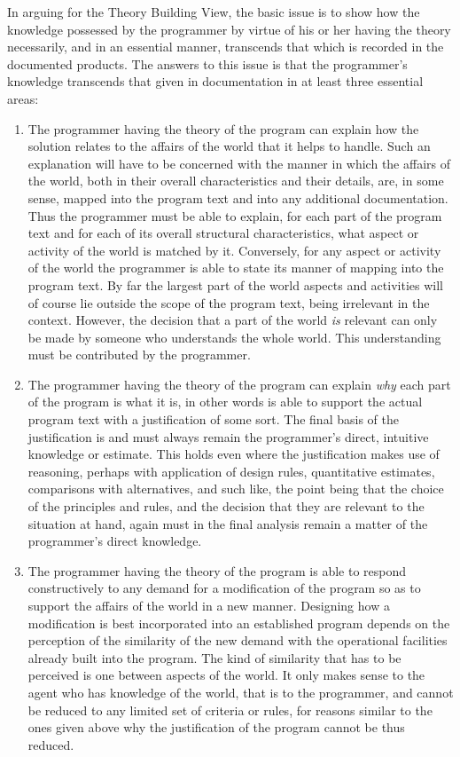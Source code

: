\documentclass[12pt,letterpaper,twocolumn]{article}
\begin{document}
In arguing for the Theory Building View, the basic issue is to show how the knowledge possessed by the programmer by virtue of his or her having the theory necessarily, and in an essential manner, transcends that which is recorded in the documented products. The answers to this issue is that the programmer's knowledge transcends that given in documentation in at least three essential areas:
\begin{enumerate}
\item The programmer having the theory of the program can explain how the solution relates to the affairs of the world that it helps to handle. Such an explanation will have to be concerned with the manner in which the affairs of the world, both in their overall characteristics and their details, are, in some sense, mapped into the program text and into any additional documentation. Thus the programmer must be able to explain, for each part of the program text and for each of its overall structural characteristics, what aspect or activity of the world is matched by it. Conversely, for any aspect or activity of the world the programmer is able to state its manner of mapping into the program text. By far the largest part of the world aspects and activities will of course lie outside the scope of the program text, being irrelevant in the context. However, the decision that a part of the world \emph{is} relevant can only be made by someone who understands the whole world. This understanding must be contributed by the programmer.

\item The programmer having the theory of the program can explain \emph{why} each part of the program is what it is, in other words is able to support the actual program text with a justification of some sort. The final basis of the justification is and must always remain the programmer's direct, intuitive knowledge or estimate. This holds even where the justification makes use of reasoning, perhaps with application of design rules, quantitative estimates, comparisons with alternatives, and such like, the point being that the choice of the principles and rules, and the decision that they are relevant to the situation at hand, again must in the final analysis remain a matter of the programmer's direct knowledge.

\item The programmer having the theory of the program is able to respond constructively to any demand for a modification of the program so as to support the affairs of the world in a new manner. Designing how a modification is best incorporated into an established program depends on the perception of the similarity of the new demand with the operational facilities already built into the program. The kind of similarity that has to be perceived is one between aspects of the world. It only makes sense to the agent who has knowledge of the world, that is to the programmer, and cannot be reduced to any limited set of criteria or rules, for reasons similar to the ones given above why the justification of the program cannot be thus reduced.
\end{enumerate}
\end{document}
